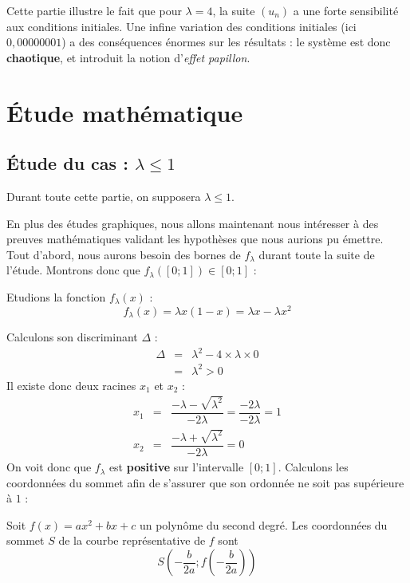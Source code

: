 Cette partie illustre le fait que pour $\lambda = 4$, la suite $(u_n)$ a une forte sensibilité aux conditions initiales. Une infine variation des conditions initiales (ici $0,00000001$) a des conséquences énormes sur les résultats : le système est donc \textbf{chaotique}, et introduit la notion d'\textit{effet papillon}.


\section{\'Etude mathématique}
\subsection{\'Etude du cas : \texorpdfstring{$\lambda \leq 1$}{Lg}}
\label{section:lambda_1}
Durant toute cette partie, on supposera $\lambda \leq 1$.

En plus des études graphiques, nous allons maintenant nous intéresser à des preuves mathématiques validant les hypothèses que nous aurions pu émettre.
Tout d'abord, nous aurons besoin des bornes de $f_\lambda$ durant toute la suite de l'étude. Montrons donc que $f_\lambda([0;1])\in[0;1]$ :

Etudions la fonction $f_\lambda(x)$ :
\[
    f_\lambda(x)=\lambda x(1-x) = \lambda x - \lambda x^2
\]

Calculons son discriminant $\Delta$ :
\[
    \begin{array}{rcl}
        \Delta &=& \lambda^2-4\times\lambda\times 0 \\
        &=& \boxed{\lambda^2 > 0}
    \end{array}
\]
Il existe donc deux racines $x_1$ et $x_2$ :
\[
    \begin{array}{rcl}
        x_1 &=& \dfrac{- \lambda-\sqrt{\lambda^2}}{-2\lambda} = \dfrac{-2\lambda}{-2\lambda} = \boxed{1} \\
        x_2 &=& \dfrac{- \lambda+\sqrt{\lambda^2}}{-2\lambda} = \boxed{0}
    \end{array}
\]
On voit donc que $f_\lambda$ est \textbf{positive} sur l'intervalle $[0;1]$. Calculons les coordonnées du sommet afin de s'assurer que son ordonnée ne soit pas supérieure à $1$ :
\begin{axiome}
    Soit $f(x) = ax^2+bx+c$ un polynôme du second degré. Les coordonnées du sommet $S$ de la courbe représentative de $f$ sont
    \[
          S\left(-\frac{b}{2a};f\left(-\frac{b}{2a}\right)\right)
    \]
\end{axiome}

